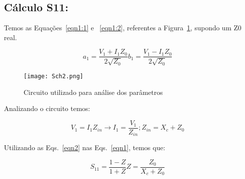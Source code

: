 \documentclass[a4paper,12pt]{proc}
\begin{document}
\subsection{Cálculo S11:}

Temos as Equações~\ref{eqn1:1} e ~\ref{eqn1:2}, referentes a Figura~\ref{sch2}, supondo um Z0 real.

\begin{subequations}
    \label{eqn1}
    \begin{equation}
        \label{eqn1:1}
        a_{1} = \frac{V_{1}+I_{1}Z_{0}}{2\sqrt{Z_{0}}}
    \end{equation}
    \begin{equation}
        \label{eqn1:2}
        b_{1} = \frac{V_{1}-I_{1}Z_{0}}{2\sqrt{Z_{0}}}
    \end{equation}
    
\end{subequations}

\begin{figure}[htbp]
    \centering
    \texttt{[image: Sch2.png]}
    \caption{Circuito utilizado para análise dos parâmetros}
    \label{sch2}
\end{figure}

Analizando o circuito temos:

\begin{subequations}
    \label{eqn2}
    \begin{equation}
        \label{eqn2:1}
        V_{1} = I_{1}Z_{in}\rightarrow I_{1} = \frac{V_{1}}{Z_{in}};
    \end{equation}

    \begin{equation}
        \label{eqn2:2}
        Z_{in} = X_{c} + Z_{0}
    \end{equation}
\end{subequations}

Utilizando as Eqs.~\ref{eqn2} nas Eqs.~\ref{eqn1}, temos que:

\begin{subequations}
    \label{eqn3}
    \begin{equation}
        \label{eqn3:1}
        S_{11} = \frac{1 - Z}{1 + Z} 
    \end{equation}

    \begin{equation}
        \label{eqn3:2}
        Z = \frac{Z_{0}}{X_{c}+Z_{0}}
    \end{equation}
\end{subequations}
\end{document}
